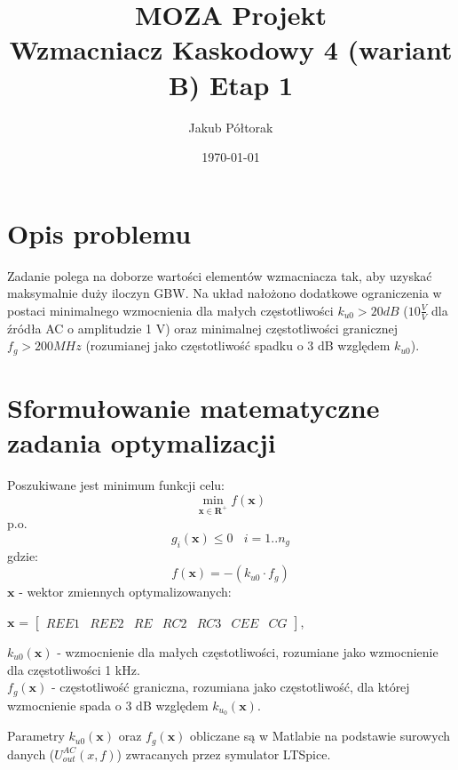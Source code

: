 \documentclass{article}
\title{\huge  \Huge \textbf{MOZA Projekt} \\ \textbf{Wzmacniacz Kaskodowy 4 (wariant B)}}
\date{\today}
\author{ \LARGE Jakub Półtorak}
\begin{document}
\maketitle
{}
\newpage
{}
\tableofcontents

\pagebreak

\begin{center}
	\title{ \huge \textbf{Etap 1}}
\end{center}


\section*{Opis problemu}
Zadanie polega na doborze wartości elementów wzmacniacza tak, aby uzyskać maksymalnie duży iloczyn
GBW. Na układ nałożono dodatkowe ograniczenia w postaci minimalnego wzmocnienia dla małych częstotliwości $k_{u0} > 20 dB$ ($10 \frac{V}{V}$ dla źródła AC o amplitudzie 1 V) oraz minimalnej częstotliwości
granicznej $f_g > 200 MHz$ (rozumianej jako częstotliwość spadku o 3 dB względem $k_{u0}$).
\section{Sformułowanie matematyczne zadania optymalizacji}
Poszukiwane jest minimum funkcji celu:
\[ \min\limits_{\textbf{x}\in \mathbf{R}^+  } f(\textbf{x}) \]
p.o.
\[ g_{i}(\textbf{x}) \leq 0 \ \ \ \  i=1..n_g\]
gdzie:
\[ f(\textbf{x}) = -(k_{u0}\cdot f_g)\]
\(\textbf{x}\) - wektor zmiennych optymalizowanych: \\
\begin{center}
	$\textbf{x}$ =
	$\begin{bmatrix}
			REE1 & REE2 & RE & RC2 & RC3 & CEE & CG
		\end{bmatrix}$,
\end{center}
\(k_{u0}(\textbf{x})\) - wzmocnienie dla małych częstotliwości, rozumiane jako wzmocnienie dla częstotliwości 1 kHz.\\
\(f_{g}(\textbf{x})\) - częstotliwość graniczna, rozumiana jako częstotliwość, dla której wzmocnienie
spada o 3 dB względem $k_{u_{0}}(\textbf{x}) $.

Parametry $k_{u0}(\textbf{x})$ oraz $f_g(\textbf{x})$ obliczane są w Matlabie na podstawie surowych danych ($U^{AC}_{out}(x,f)$) zwracanych
przez symulator LTSpice.
\end{document}
